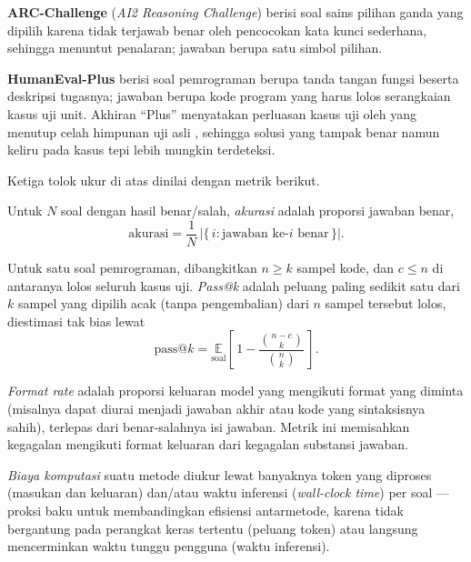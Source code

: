 \textbf{ARC-Challenge} \citep{arc} (\textit{AI2 Reasoning Challenge})
berisi soal sains pilihan ganda yang dipilih karena tidak terjawab benar
oleh pencocokan kata kunci sederhana, sehingga menuntut penalaran;
jawaban berupa satu simbol pilihan.

\textbf{HumanEval-Plus} \citep{humaneval,evalplus} berisi soal
pemrograman berupa tanda tangan fungsi beserta deskripsi tugasnya;
jawaban berupa kode program yang harus lolos serangkaian kasus uji unit.
Akhiran ``Plus'' menyatakan perluasan kasus uji oleh \citet{evalplus} yang
menutup celah himpunan uji asli \citep{humaneval}, sehingga solusi yang
tampak benar namun keliru pada kasus tepi lebih mungkin terdeteksi.

Ketiga tolok ukur di atas dinilai dengan metrik berikut.

\begin{definisi}
\label{def:akurasi}
Untuk $N$ soal dengan hasil benar/salah, \textit{akurasi} adalah proporsi
jawaban benar,
\begin{equation}
  \text{akurasi} = \frac{1}{N}\,
  \bigl|\{\,i : \text{jawaban ke-}i\text{ benar}\,\}\bigr|.
  \label{eq:akurasi}
\end{equation}
\end{definisi}

\begin{definisi}
\label{def:passk}
Untuk satu soal pemrograman, dibangkitkan $n\ge k$ sampel kode, dan
$c\le n$ di antaranya lolos seluruh kasus uji. \textit{Pass@k} adalah
peluang paling sedikit satu dari $k$ sampel yang dipilih acak (tanpa
pengembalian) dari $n$ sampel tersebut lolos, diestimasi tak bias lewat
\begin{equation}
  \text{pass@}k = \underset{\text{soal}}{\mathbb{E}}
  \left[\, 1 - \frac{\binom{n-c}{k}}{\binom{n}{k}} \,\right].
  \label{eq:passk}
\end{equation}
\end{definisi}

\begin{definisi}
\label{def:formatrate}
\textit{Format rate} adalah proporsi keluaran model yang mengikuti format
yang diminta (misalnya dapat diurai menjadi jawaban akhir atau kode yang
sintaksisnya sahih), terlepas dari benar-salahnya isi jawaban. Metrik ini
memisahkan kegagalan mengikuti format keluaran dari kegagalan substansi
jawaban.
\end{definisi}

\begin{definisi}
\label{def:biayakomputasi}
\textit{Biaya komputasi} suatu metode diukur lewat banyaknya token yang
diproses (masukan dan keluaran) dan/atau waktu inferensi (\textit{wall-clock
time}) per soal --- proksi baku untuk membandingkan efisiensi
antarmetode, karena tidak bergantung pada perangkat keras tertentu (peluang
token) atau langsung mencerminkan waktu tunggu pengguna (waktu inferensi).
\end{definisi}


